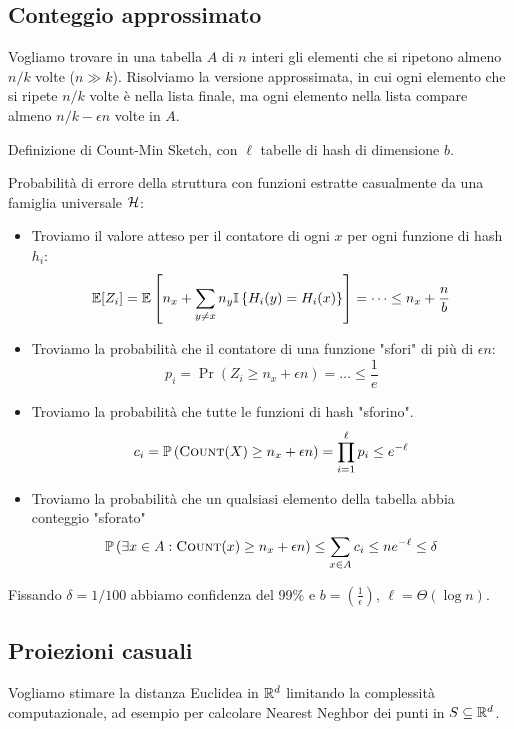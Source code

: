 \subsection{Conteggio approssimato}

Vogliamo trovare in una tabella $A$ di $n$ interi gli elementi che si ripetono almeno $n/k$ volte ($n \gg k$). Risolviamo la versione approssimata, in cui ogni elemento che si ripete $n/k$ volte è nella lista finale, ma ogni elemento nella lista compare almeno $n/k - \epsilon n$ volte in $A$.

Definizione di Count-Min Sketch, con $\ell$ tabelle di hash di dimensione $b$.

Probabilità di errore della struttura con funzioni estratte casualmente da una famiglia universale $\H$:
\begin{itemize}
	\item Troviamo il valore atteso per il contatore di ogni $x$ per ogni funzione di hash $h_i$:
	$$\Ex [Z_i] = \Ex \left[n_x + \sum_{y \neq x} n_y \Ind \left\{H_i (y) = H_i (x)\right\}\right] = \dots \leq n_x + \frac{n}{b} $$
	
	\item Troviamo la probabilità che il contatore di una funzione "sfori" di più di $\epsilon n$:
	$$ p_i = \Pr \left(Z_i \geq n_x + \epsilon n\right) = \dots \leq \frac{1}{e} $$
	
	\item Troviamo la probabilità che tutte le funzioni di hash "sforino". 
	$$ c_i = \Pr \left(\text{\textsc{Count}}(X) \geq n_x + \epsilon n \right) = \prod_{i = 1}^\ell p_i \leq e^{-\ell} $$
	
	\item Troviamo la probabilità che un qualsiasi elemento della tabella abbia conteggio "sforato"
	$$ \Pr \left(\exists x \in A: \text{\textsc{Count}}(x) \geq n_x + \epsilon n\right) \leq \sum_{x \in A} c_i \leq n e^{-\ell} \leq \delta $$
\end{itemize}
Fissando $\delta = 1/100$ abbiamo confidenza del 99\% e $b = \left(\frac{1}{\epsilon}\right)$, $\ell = \Theta (\log n)$.

\subsection{Proiezioni casuali}

Vogliamo stimare la distanza Euclidea in $\R^d$ limitando la complessità computazionale, ad esempio per calcolare Nearest Neghbor dei punti in $S \subseteq \R^d$. 

